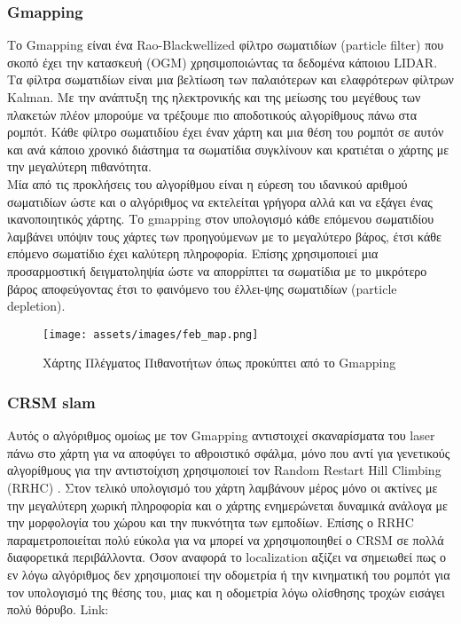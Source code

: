 \subsubsection{Gmapping}

Το Gmapping είναι ένα Rao-Blackwellized φίλτρο σωματιδίων (particle filter) που σκοπό έχει την κατασκευή (OGM) χρησιμοποιώντας τα δεδομένα κάποιου LIDAR. Τα φίλτρα σωματιδίων είναι μια βελτίωση των παλαιότερων και ελαφρότερων φίλτρων Kalman. Με την ανάπτυξη της ηλεκτρονικής και της μείωσης του μεγέθους των πλακετών πλέον μπορούμε να τρέξουμε πιο αποδοτικούς αλγορίθμους πάνω στα ρομπότ. Κάθε φίλτρο σωματιδίου έχει έναν χάρτη και μια θέση του ρομπότ σε αυτόν και ανά κάποιο χρονικό διάστημα τα σωματίδια συγκλίνουν και κρατιέται ο χάρτης με την μεγαλύτερη πιθανότητα. \\
Μία από τις προκλήσεις του αλγορίθμου είναι η εύρεση του ιδανικού αριθμού σωματιδίων ώστε και ο αλγόριθμος να εκτελείται γρήγορα αλλά και να εξάγει ένας ικανοποιητικός χάρτης. Το gmapping στον υπολογισμό κάθε επόμενου σωματιδίου λαμβάνει υπόψιν τους χάρτες των προηγούμενων με το μεγαλύτερο βάρος, έτσι κάθε επόμενο σωματίδιο έχει καλύτερη πληροφορία. Επίσης χρησιμοποιεί μια προσαρμοστική δειγματοληψία ώστε να απορρίπτει τα σωματίδια με το μικρότερο βάρος αποφεύγοντας έτσι το φαινόμενο του έλλει-ψης σωματιδίων (particle depletion).  

\begin{figure}[!h]
	\centering
	\texttt{[image: assets/images/feb\_map.png]}
	\caption{Χάρτης Πλέγματος Πιθανοτήτων όπως προκύπτει από το Gmapping}
	\label{fig:gmapping map}
\end{figure}
 
 
\subsubsection{CRSM slam}

Αυτός ο αλγόριθμος ομοίως με τον Gmapping αντιστοιχεί σκαναρίσματα του laser πάνω στο χάρτη για να αποφύγει το αθροιστικό σφάλμα, μόνο που αντί για γενετικούς αλγορίθμους για την αντιστοίχιση χρησιμοποιεί τον Random Restart Hill Climbing (RRHC) \cite{Tsardoulias2013}. Στον τελικό υπολογισμό του χάρτη λαμβάνουν μέρος μόνο οι ακτίνες με την μεγαλύτερη χωρική πληροφορία και ο χάρτης ενημερώνεται δυναμικά ανάλογα με την μορφολογία του χώρου και την πυκνότητα των εμποδίων.  Επίσης ο RRHC παραμετροποιείται πολύ εύκολα για να μπορεί να χρησιμοποιηθεί ο CRSM σε πολλά διαφορετικά περιβάλλοντα. Όσον αναφορά το localization αξίζει να σημειωθεί πως ο εν λόγω αλγόριθμος δεν χρησιμοποιεί την οδομετρία ή την κινηματική του ρομπότ για τον υπολογισμό της θέσης του, μιας και η οδομετρία λόγω ολίσθησης τροχών εισάγει πολύ θόρυβο. Link: \href{http://wiki.ros.org/crsm_slam}{\color{blue}{CRSM slam}}
 
